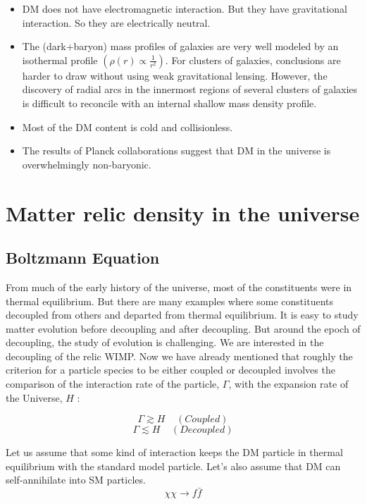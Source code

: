 \documentclass[12pt]{report}
\begin{document}
\begin{itemize}
\item DM does not have electromagnetic interaction. But they have gravitational interaction. So they are electrically neutral.

\item The (dark+baryon) mass profiles of galaxies are very well modeled by
an isothermal profile $(\rho(r)\propto \frac{1}{r^2} )$. For clusters of galaxies, conclusions
are harder to draw without using weak gravitational lensing. However,
the discovery of radial arcs in the innermost regions of several clusters
of galaxies is difficult to reconcile with an internal shallow mass density
profile.

\item Most of the DM content is cold and collisionless.
\item The results of Planck collaborations suggest that DM in the universe is overwhelmingly non-baryonic. \cite{plcol}
\end{itemize}

\newpage

\chapter{ Matter relic density in the universe}





\section{Boltzmann Equation}
	From much of the early history of the universe, most of the constituents were in thermal equilibrium. But there are many examples where some constituents decoupled from others and departed from thermal equilibrium. It is easy to study matter evolution before decoupling and after decoupling. But around the epoch of decoupling, the study of evolution is challenging. We are interested in the decoupling of the relic WIMP. Now we have already mentioned that roughly the criterion for a particle species to be either coupled or decoupled involves the comparison of the interaction rate of the particle, $\Gamma$, with the expansion rate of the Universe, $H$ \cite{kolbbook}: 
	
$$\Gamma \gtrsim H \;\;\; \;(Coupled) \label{coupled} $$ 
$$\Gamma \lesssim H \;\;\;\; (Decoupled)  \label{decoupled}$$	
	
	
	
	Let us assume that some kind of interaction keeps the DM particle in thermal equilibrium with the standard model particle. Let's also assume that DM can self-annihilate into SM particles. $$\chi\chi \rightarrow f\bar{f}$$ 
\end{document}
